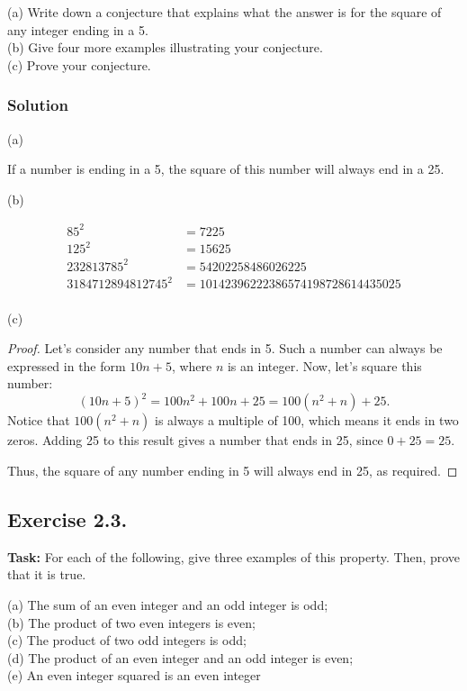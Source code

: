 \documentclass{article}
\begin{document}
\noindent (a) Write down a conjecture that explains what the answer is for the square of any integer ending in a 5.\\
(b) Give four more examples illustrating your conjecture.\\
(c) Prove your conjecture.\\

\subsubsection*{Solution}

(a)

\begin{conjecture}{}
   If a number is ending in a 5, the square of this number will always end in a 25.
\end{conjecture}

\noindent (b)

\begin{align*}
    85^2 &= 7225\\
    125^2 &= 15625\\
    232813785^2 &= 54202258486026225\\
    3184712894812745^2 &= 10142396222386574198728614435025\\
\end{align*}

\noindent (c)

\begin{proof}
Let’s consider any number that ends in 5. Such a number can always be expressed in the form \( 10n + 5 \), where \( n \) is an integer. Now, let’s square this number:
\[
(10n + 5)^2 = 100n^2 + 100n + 25 = 100(n^2 + n) + 25.
\]
Notice that \( 100(n^2 + n) \) is always a multiple of 100, which means it ends in two zeros. Adding 25 to this result gives a number that ends in 25, since \( 0 + 25 = 25 \).

Thus, the square of any number ending in 5 will always end in 25, as required.
\end{proof}


\subsection{Exercise 2.3.}
\textbf{Task:} For each of the following, give three examples of this property. Then, prove that it is true.

\noindent (a) The sum of an even integer and an odd integer is odd;\\
(b) The product of two even integers is even;\\
(c) The product of two odd integers is odd;\\
(d) The product of an even integer and an odd integer is even;\\
(e) An even integer squared is an even integer
\end{document}
